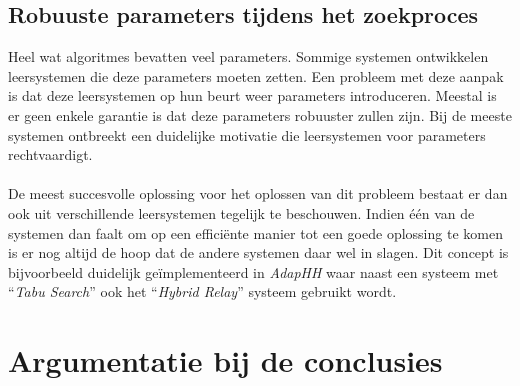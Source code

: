 \subsection{Robuuste parameters tijdens het zoekproces}
Heel wat algoritmes bevatten veel parameters. Sommige systemen ontwikkelen leersystemen die deze parameters moeten zetten. Een probleem met deze aanpak is dat deze leersystemen op hun beurt weer parameters introduceren. Meestal is er geen enkele garantie is dat deze parameters robuuster zullen zijn. Bij de meeste systemen ontbreekt een duidelijke motivatie die leersystemen voor parameters rechtvaardigt.
\paragraph{}
De meest succesvolle oplossing voor het oplossen van dit probleem bestaat er dan ook uit verschillende leersystemen tegelijk te beschouwen. Indien \'e\'en van de systemen dan faalt om op een effici\"ente manier tot een goede oplossing te komen is er nog altijd de hoop dat de andere systemen daar wel in slagen. Dit concept is bijvoorbeeld duidelijk ge\"implementeerd in \emph{AdapHH} waar naast een systeem met ``\emph{Tabu Search}'' ook het ``\emph{Hybrid Relay}'' systeem gebruikt wordt.

\section{Argumentatie bij de conclusies}



